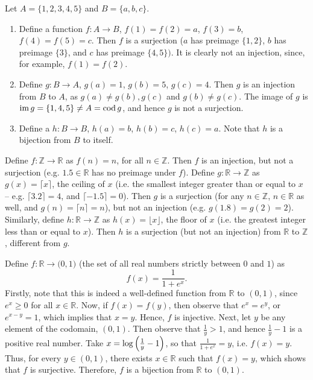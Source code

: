 \begin{Example}
Let $A = \{1, 2, 3, 4, 5\}$ and $B = \{a, b, c\}$.
\begin{enumerate}
\item Define a function $f \colon A \to B$, $f(1) = f(2) = a$, $f(3) = b$, $f(4) = f(5) = c$. Then $f$ is a surjection ($a$ has preimage $\{1, 2\}$, $b$ has preimage $\{3\}$, and $c$ has preimage $\{4, 5\})$. It is clearly not an injection, since, for example, $f(1) = f(2)$.

\item Define $g \colon B \to A$, $g(a) = 1$, $g(b) = 5$, $g(c) = 4$. Then $g$ is an injection from $B$ to $A$, as $g(a) \ne g(b), g(c)$ and $g(b) \ne g(c)$. The image of $g$ is $\operatorname{im} g = \{1, 4, 5\} \ne A = \operatorname{cod} g$, and hence $g$ is not a surjection.

\item Define a $h \colon B \to B$, $h(a) = b$, $h(b) = c$, $h(c) = a$. Note that $h$ is a bijection from $B$ to itself.
\end{enumerate}
\end{Example}

\begin{Example}
Define $f \colon \mathbb Z \to \mathbb R$ as $f(n) = n$, for all $n \in \mathbb Z$. Then $f$ is an injection, but not a surjection (e.g. $1.5 \in \mathbb R$ has no preimage under $f$). Define $g \colon \mathbb R \to \mathbb Z$ as $g(x) = \lceil x \rceil$, the ceiling of $x$ (i.e. the smallest integer greater than or equal to $x$ -- e.g. $\lceil 3.2 \rceil = 4$, and $\lceil -1.5 \rceil = 0$). Then $g$ is a surjection (for any $n \in \mathbb Z$, $n \in \mathbb R$ as well, and $g(n) = \lceil n \rceil = n$), but not an injection (e.g. $g(1.8) = g(2) = 2$). Similarly, define $h \colon \mathbb R \to \mathbb Z$ as $h(x) = \lfloor x \rfloor$, the floor of $x$ (i.e. the greatest integer less than or equal to $x$). Then $h$ is a surjection (but not an injection) from $\mathbb R$ to $\mathbb Z$, different from $g$.
\end{Example}

\begin{Example}\label{ex:RIsom01}
Define $f \colon \mathbb R \to \mathbb (0,1)$ (the set of all real numbers strictly between $0$ and $1$) as
\begin{equation*}
f(x) = \dfrac{1}{1 + e^x}.
\end{equation*}
Firstly, note that this is indeed a well-defined function from $\mathbb R$ to $(0, 1)$, since $e^x \ge 0$ for all $x \in \mathbb R$. Now, if $f(x) = f(y)$, then observe that $e^x = e^y$, or $e^{x - y} = 1$, which implies that $x = y$. Hence, $f$ is injective. Next, let $y$ be any element of the codomain, $(0, 1)$. Then observe that $\frac 1 y > 1$, and hence $\frac 1 y - 1$ is a positive real number. Take $x = \log\pqty{\frac 1 y - 1}$, so that $\frac 1 {1 + e^x} = y$, i.e. $f(x) = y$. Thus, for every $y \in (0, 1)$, there exists $x \in \mathbb R$ such that $f(x) = y$, which shows that $f$ is surjective. Therefore, $f$ is a bijection from $\mathbb R$ to $(0, 1)$.
\end{Example}

